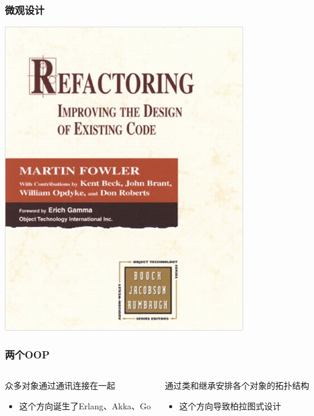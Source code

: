 \begin{frame}
    \frametitle{微观设计}
    \begin{center}
        \includegraphics[height=0.7\textheight]{refactor.png}
    \end{center}
\end{frame}

\begin{frame}
    \frametitle{两个OOP}
    \begin{columns}[t]
        \begin{column}{0.45\textwidth}
            \begin{block}{众多对象通过通讯连接在一起}
                \begin{itemize}
                    \item 这个方向诞生了Erlang、Akka、Go
                \end{itemize}
            \end{block}
        \end{column}
        \begin{column}{0.45\textwidth}
            \begin{block}{通过类和继承安排各个对象的拓扑结构}
                \begin{itemize}
                    \item 这个方向导致柏拉图式设计
                \end{itemize}
            \end{block}
        \end{column}
    \end{columns}
\end{frame}

